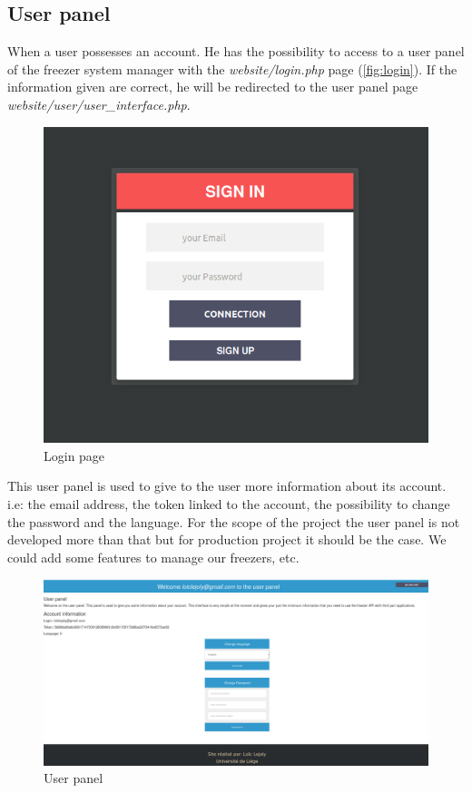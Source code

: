 \subsection{User panel}
When a user possesses an account. He has the possibility to access to a user panel of the freezer system manager with the \textit{website/login.php} page (\autoref{fig:login}). If the information given are correct, he will be redirected to the user panel page \textit{website/user/user\_interface.php}.
\begin{figure}[H]
\centering
\includegraphics[scale=0.4]{./images/login.png}
\caption{Login page}
\label{fig:login}
\end{figure}

This user panel is used to give to the user more information about its account. i.e: the email address, the token linked to the account, the possibility to change the password and the language. For the scope of the project the user panel is not developed more than that but for production project it should be the case. We could add some features to manage our freezers, etc.

\begin{figure}[H]
\centering
\includegraphics[scale=0.25]{./images/userPanel.png}
\caption{User panel}
\label{fig:login}
\end{figure}
